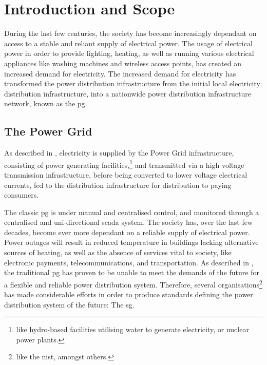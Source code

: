 \chapter{Introduction and Scope}


During the last few centuries, the society  has become increasingly dependant on access to a stable and reliant supply of electrical power. The usage of electrical power in order to provide lighting, heating, as well as running various electrical appliances like washing machines and wireless access points, has created an increased demand for electricity. The increased demand for electricity has transformed the power distribution infrastructure from the initial local electricity distribution infrastructure, into a nationwide power distribution infrastructure network, known as the \acrfull{pg}.







\section{The Power Grid}
As described in \cite{BlumeStevenW2007Epsb}, electricity is supplied by the Power Grid infrastructure, consisting of power generating facilities,\footnote{like hydro-based facilities utilising water to generate electricity, or nuclear power plants.} and transmitted via a high voltage transmission infrastructure, before being converted to  lower voltage electrical currents, fed to the distribution infrastructure for distribution to paying consumers.


The classic \acrlong{pg} is under manual and centralised control, and monitored through a centralised and uni-directional \acrfull{scada} system.
The society has, over the last few decades, become ever more dependant on a reliable supply of electrical power. Power outages will result in reduced temperature in buildings lacking alternative sources of heating, as well as the absence of services vital to society, like electronic payments, telecommunications, and transportation.
As described in \cite{rehmani2019software}, the traditional \acrlong{pg} has proven to be unable to meet the demands of the future for a flexible and reliable power distribution system.
Therefore, several organisations\footnote{like the \acrfull{nist}, amongst others.} has made considerable efforts in order to produce standards defining the  power distribution system of the future: The \acrfull{sg}.



